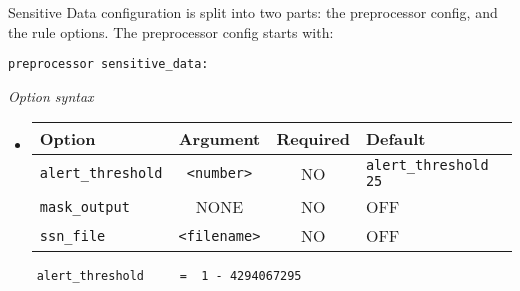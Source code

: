 \documentclass[english]{report}
\begin{document}
Sensitive Data configuration is split into two parts: the preprocessor config,
and the rule options. The preprocessor config starts with:

\begin{verbatim}
preprocessor sensitive_data:
\end{verbatim}

\textit{Option syntax}
\begin{itemize}

\item[]
\begin{tabular}{|l|c|c|p{6cm}|}
\hline
Option & Argument & Required & Default\\
\hline
\hline
\texttt{alert\_threshold} & \texttt{<number>} & NO & \texttt{alert\_threshold 25}\\
\hline
\texttt{mask\_output} & NONE & NO & OFF\\
\hline
\texttt{ssn\_file} & \texttt{<filename>} & NO & OFF\\
\hline
\end{tabular}
\end{itemize}

\footnotesize
\begin{verbatim}
    alert_threshold     =  1 - 4294067295
\end{verbatim}
\normalsize
\end{document}

